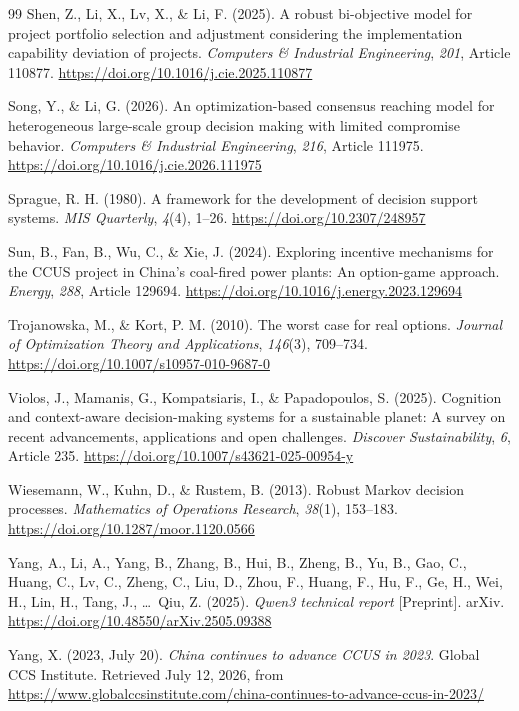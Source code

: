 \documentclass[5p,times,authoryear]{elsarticle}
\theoremstyle{plain}
\begin{document}
\begin{thebibliography}{99}
Shen, Z., Li, X., Lv, X., \& Li, F. (2025). A robust bi-objective model for project portfolio selection and adjustment considering the implementation capability deviation of projects. \emph{Computers \& Industrial Engineering}, \emph{201}, Article 110877. \url{https://doi.org/10.1016/j.cie.2025.110877}

Song, Y., \& Li, G. (2026). An optimization-based consensus reaching model for heterogeneous large-scale group decision making with limited compromise behavior. \emph{Computers \& Industrial Engineering}, \emph{216}, Article 111975. \url{https://doi.org/10.1016/j.cie.2026.111975}

Sprague, R. H. (1980). A framework for the development of decision support systems. \emph{MIS Quarterly}, \emph{4}(4), 1--26. \url{https://doi.org/10.2307/248957}

Sun, B., Fan, B., Wu, C., \& Xie, J. (2024). Exploring incentive mechanisms for the CCUS project in China's coal-fired power plants: An option-game approach. \emph{Energy}, \emph{288}, Article 129694. \url{https://doi.org/10.1016/j.energy.2023.129694}

Trojanowska, M., \& Kort, P. M. (2010). The worst case for real options. \emph{Journal of Optimization Theory and Applications}, \emph{146}(3), 709--734. \url{https://doi.org/10.1007/s10957-010-9687-0}

Violos, J., Mamanis, G., Kompatsiaris, I., \& Papadopoulos, S. (2025). Cognition and context-aware decision-making systems for a sustainable planet: A survey on recent advancements, applications and open challenges. \emph{Discover Sustainability}, \emph{6}, Article 235. \url{https://doi.org/10.1007/s43621-025-00954-y}

Wiesemann, W., Kuhn, D., \& Rustem, B. (2013). Robust Markov decision processes. \emph{Mathematics of Operations Research}, \emph{38}(1), 153--183. \url{https://doi.org/10.1287/moor.1120.0566}

Yang, A., Li, A., Yang, B., Zhang, B., Hui, B., Zheng, B., Yu, B., Gao, C., Huang, C., Lv, C., Zheng, C., Liu, D., Zhou, F., Huang, F., Hu, F., Ge, H., Wei, H., Lin, H., Tang, J., \ldots\ Qiu, Z. (2025). \emph{Qwen3 technical report} [Preprint]. arXiv. \url{https://doi.org/10.48550/arXiv.2505.09388}

Yang, X. (2023, July 20). \emph{China continues to advance CCUS in 2023}. Global CCS Institute. Retrieved July 12, 2026, from \url{https://www.globalccsinstitute.com/china-continues-to-advance-ccus-in-2023/}

\end{thebibliography}
\end{document}
